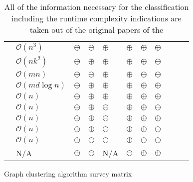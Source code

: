 \documentclass[12pt,a4paper]{report}
\begin{document}
\begin{table}[ht!]
\def\arraystretch{1.60}
\begin{tabularx}{\textwidth}{|Y||p{2.4cm}|Y|Y|Y|Y|Y|Y|Y|Y|Y|}
 \hline
  &  &  &  &  &  &  &  \\
 \hline\hline
 \cite{girvan2002community}     & \(\mathcal{O}(n^3)\)          & $\oplus$  & $\ominus$  & $\oplus$   & $\oplus$  & $\oplus$  & $\oplus$ \\\hline
 \cite{vandongen2000graph}      & \(\mathcal{O}(nk^2)\)         & $\oplus$  & $\oplus$   & $\oplus$   & $\oplus$  & $\oplus$  & $\ominus$ \\\hline
 \cite{pons2005computing}       & \(\mathcal{O}(mn)\)           & $\oplus$  & $\ominus$  & $\oplus$   & $\oplus$  & $\ominus$ & $\ominus$ \\\hline
 \cite{clauset2004modularity}   & \(\mathcal{O}(md \log{n})\)   & $\oplus$  & $\oplus$   & $\oplus$   & $\oplus$  & $\oplus$  & $\oplus$ \\\hline
 \cite{blondel2008modularity}   & \(\mathcal{O}(n)\)            & $\oplus$  & $\oplus$   & $\oplus$   & $\oplus$  & $\oplus$  & $\oplus$ \\\hline
 \cite{raghavan2007lpa}         & \(\mathcal{O}(n)\)            & $\oplus$  & $\oplus$   & $\ominus$  & $\oplus$  & $\oplus$  & $\ominus$ \\\hline
 \cite{rosvall2008infomap}      & \(\mathcal{O}(n)\)            & $\oplus$  & $\oplus$   & $\ominus$  & $\oplus$  & $\oplus$  & $\oplus$ \\\hline
 \cite{biemann2006chinese}      & \(\mathcal{O}(n)\)            & $\oplus$  & $\oplus$   & $\ominus$  & $\oplus$  & $\oplus$  & $\ominus$ \\\hline
 \cite{reichardt2004detecting}  & \(\mathcal{O}(n)\)            & $\oplus$  & $\ominus$  & $\ominus$  & $\oplus$  & $\ominus$ & $\ominus$ \\\hline
 \cite{donetti2004detecting}    & N/A                           & $\oplus$  & $\ominus$  & N/A        & $\ominus$ & $\oplus$  & $\oplus$ \\\hline
\end{tabularx}
\caption{Graph clustering algorithm survey matrix}
\caption*{\centering
  All of the information necessary for the classification including the
  runtime complexity indications are taken out of the original papers of the
}
\end{table}
\end{document}

